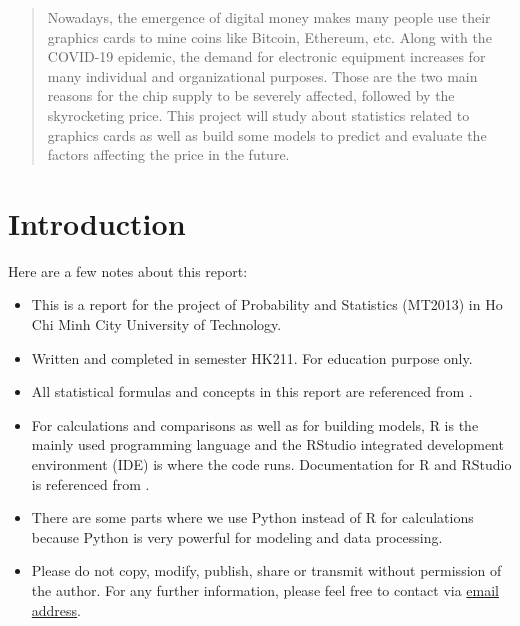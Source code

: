 \documentclass[a4paper]{article}
\begin{document}

\newpage
\tableofcontents
\newpage


\begin{abstract}
    Nowadays, the emergence of digital money makes many people use their graphics cards to mine coins like Bitcoin, Ethereum, etc. Along with the COVID-19 epidemic, the demand for electronic equipment increases for many individual and organizational purposes. Those are the two main reasons for the chip supply to be severely affected, followed by the skyrocketing price. This project will study about statistics related to graphics cards as well as build some models to predict and evaluate the factors affecting the price in the future.
\end{abstract}

\section{Introduction}
Here are a few notes about this report:
\begin{itemize}
    \item This is a report for the project of Probability and Statistics (MT2013) in Ho Chi Minh City University of Technology.
    \item Written and completed in semester HK211. For education purpose only.
    \item All statistical formulas and concepts in this report are referenced from \cite{bib1, bib2, bib3}.
    \item For calculations and comparisons as well as for building models, R is the mainly used programming language and the RStudio integrated development environment (IDE) is where the code runs. Documentation for R and RStudio is referenced from \cite{bib12}.
    \item There are some parts where we use Python instead of R for calculations because Python is very powerful for modeling and data processing.
    \item Please do not copy, modify, publish, share or transmit without permission of the author. For any further information, please feel free to contact via \href{mailto:phat.tran.k19@hcmut.edu.vn}{email address}.
\end{itemize}
\end{document}
